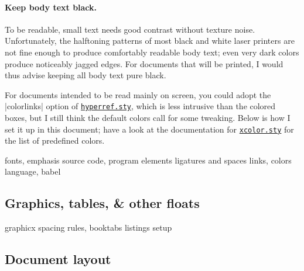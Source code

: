 \documentclass[a4paper,twoside,nofonts]{tufte-handout}
\makeatletter
\newcommand\code[1]{\texttt{#1}}
\let\file\code
\def\ctan@prefix{http://ctan.tug.org/pkg/}
\newcommand\package[2][\@empty]{%
  \href{\ctan@prefix #2}{\file{\ifx #1\@empty #2.sty\else #1\fi}}}
\makeatother
\begin{document}
\paragraph{Keep body text black.}
To be readable, small text needs good contrast without texture noise.
Unfortunately, the halftoning patterns of most black and white laser printers are not fine enough to produce comfortably readable body text; even very dark colors produce noticeably jagged edges.
For documents that will be printed, I would thus advise keeping all body text pure black.

For documents intended to be read mainly on screen, you could adopt the |colorlinks| option of \package{hyperref}, which is less intrusive than the colored boxes, but I still think the default colors call for some tweaking.
Below is how I set it up in this document; have a look at the documentation for \package{xcolor} for the list of predefined colors.
\begin{latexcode}
  \hypersetup{
    breaklinks, colorlinks,
    urlcolor=externallinkcolor,
    filecolor=externallinkcolor,
    linkcolor=internallinkcolor,
    citecolor=internallinkcolor,
  }
\end{latexcode}

\begin{todoenv}
    fonts, emphasis
    source code, program elements
    ligatures and spaces
    links, colors
    language, babel
\end{todoenv}

\subsection{Graphics, tables, \& other floats} %
\label{sec:graphics}

\cite{tufte}

\begin{todoenv}
    graphicx
    spacing
    rules, booktabs
    listings setup
\end{todoenv}

\subsection{Document layout} %
\label{sec:layout}
\end{document}
